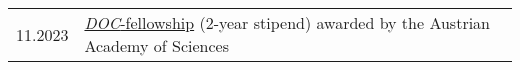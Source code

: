 
\begin{longtable}[l]{@{}p{} p{}}
    11.2023 & \href{https://stipendien.oeaw.ac.at/en/fellowships/doc}{\emph{DOC}-fellowship} (2-year stipend) awarded by the Austrian Academy of Sciences\\

\end{longtable}
